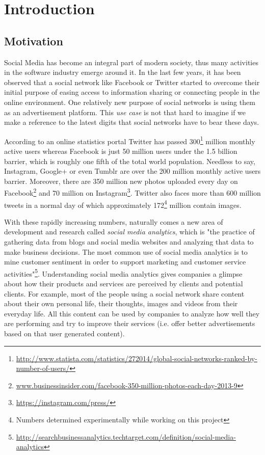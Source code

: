 \chapter{Introduction}
\label{chapter:intro}


\section{Motivation}
\label{sec:proj-motivation}

Social Media has become an integral part of modern society, thus many
activities in the software industry emerge around it. In the last few years,
it has been observed that a social network like
Facebook or Twitter started to overcome their initial
purpose of easing access to information sharing or connecting people in the
online environment. One relatively new purpose of social networks is using
them as an advertisement platform. This \textit{use case} is not that hard to
imagine if we make a reference to the latest digits that social networks have
to bear these days.

According to an online statistics portal\cite{statista} Twitter has passed 300\footnote{\url{http://www.statista.com/statistics/272014/global-social-networks-ranked-by-number-of-users/}}
million monthly active users whereas Facebook is just 50 million users under
the 1.5 billion barrier, which is roughly one fifth of the total world population.
Needless to say, Instagram, Google+ or even Tumblr are over the 200
million monthly active users barrier. Moreover, there are 350 million new
photos uploaded every day on Facebook\footnote{\url{www.businessinsider.com/facebook-350-million-photos-each-day-2013-9}}
and 70 million on Instagram\footnote{\url{https://instagram.com/press/}}.
Twitter also faces more than 600 million tweets in a normal day of which
approximately 172\footnote{Numbers determined
experimentally while working on this project} million contain images.

With these rapidly increasing numbers, naturally comes a new area of
development and research called \textit{social media analytics}, which is "the
practice of gathering data from blogs and social media websites and analyzing
that data to make business decisions. The most common use of social media
analytics is to mine customer sentiment in order to support marketing and
customer service
activities"\footnote{\url{http://searchbusinessanalytics.techtarget.com/definition/social-media-analytics}}.
Understanding social media analytics gives companies a glimpse about how their
products and services are perceived by clients and potential clients. For
example, most of the people using a social network share content about their
own personal life, their thoughts, images and videos from their everyday life.
All this content can be used by companies to analyze how well they are
performing and try to improve their services (i.e. offer better advertisements
based on that user generated content).

